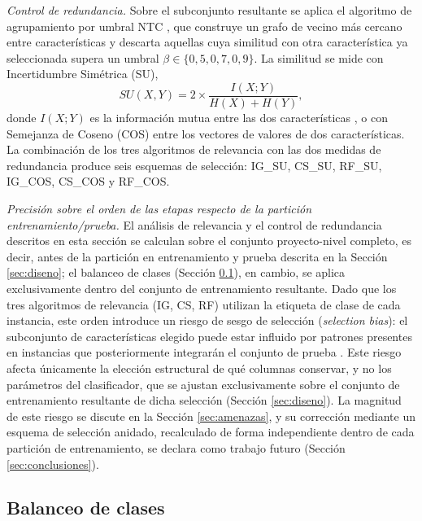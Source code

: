 \documentclass[conference,a4paper]{IEEEtran}
\begin{document}
\textit{Control de redundancia.} Sobre el subconjunto resultante se aplica el algoritmo de agrupamiento por umbral NTC \cite{liu2015}, que construye un grafo de vecino más cercano entre características y descarta aquellas cuya similitud con otra característica ya seleccionada supera un umbral $\beta \in \{0{,}5, 0{,}7, 0{,}9\}$. La similitud se mide con Incertidumbre Simétrica (SU),
\begin{equation}
SU(X,Y) = 2 \times \frac{I(X;Y)}{H(X)+H(Y)},
\label{eq:su}
\end{equation}
donde $I(X;Y)$ es la información mutua entre las dos características \cite{yu2003}, o con Semejanza de Coseno (COS) entre los vectores de valores de dos características. La combinación de los tres algoritmos de relevancia con las dos medidas de redundancia produce seis esquemas de selección: IG\_SU, CS\_SU, RF\_SU, IG\_COS, CS\_COS y RF\_COS.

\textit{Precisión sobre el orden de las etapas respecto de la partición entrenamiento/prueba.} El análisis de relevancia y el control de redundancia descritos en esta sección se calculan sobre el conjunto proyecto-nivel completo, es decir, antes de la partición en entrenamiento y prueba descrita en la Sección \ref{sec:diseno}; el balanceo de clases (Sección \ref{sec:balanceo}), en cambio, se aplica exclusivamente dentro del conjunto de entrenamiento resultante. Dado que los tres algoritmos de relevancia (IG, CS, RF) utilizan la etiqueta de clase de cada instancia, este orden introduce un riesgo de sesgo de selección (\textit{selection bias}): el subconjunto de características elegido puede estar influido por patrones presentes en instancias que posteriormente integrarán el conjunto de prueba \cite{ambroise2002,cawley2010}. Este riesgo afecta únicamente la elección estructural de qué columnas conservar, y no los parámetros del clasificador, que se ajustan exclusivamente sobre el conjunto de entrenamiento resultante de dicha selección (Sección \ref{sec:diseno}). La magnitud de este riesgo se discute en la Sección \ref{sec:amenazas}, y su corrección mediante un esquema de selección anidado, recalculado de forma independiente dentro de cada partición de entrenamiento, se declara como trabajo futuro (Sección \ref{sec:conclusiones}).

\subsection{Balanceo de clases}
\label{sec:balanceo}
\end{document}
